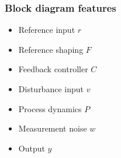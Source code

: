 \documentclass[10pt]{beamer-control}
\begin{document}
\begin{frame}
  \frametitle{Block diagram features}
  \begin{itemize}
    \item Reference input $r$
    \item Reference shaping $F$
    \item Feedback controller $C$
    \item Disturbance input $v$
    \item Process dynamics $P$
    \item Measurement noise $w$
    \item Output $y$
  \end{itemize}
\end{frame}



\SUMMARYFRAME
\FINALE
\end{document}
